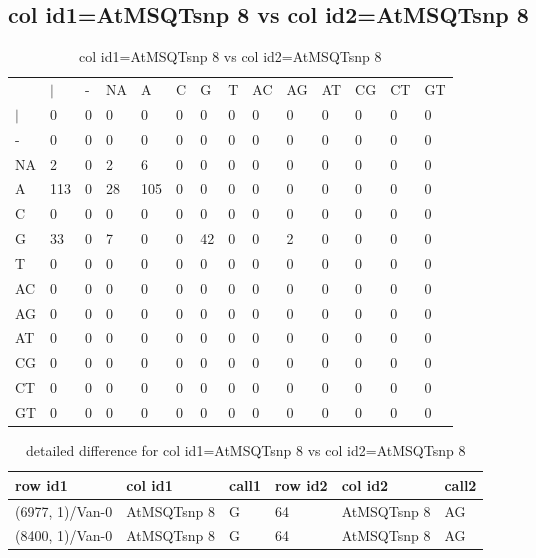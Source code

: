 \subsection{col id1=AtMSQTsnp 8 vs col id2=AtMSQTsnp 8}
\begin{center}
\begin{longtable}{|l|l|l|l|l|l|l|l|l|l|l|l|l|l|}
\caption{col id1=AtMSQTsnp 8 vs col id2=AtMSQTsnp 8} \label{table_dm962}\\
\hline
\\
\hline
&$|$&-&NA&A&C&G&T&AC&AG&AT&CG&CT&GT\\
$|$&0&0&0&0&0&0&0&0&0&0&0&0&0\\
-&0&0&0&0&0&0&0&0&0&0&0&0&0\\
NA&2&0&2&6&0&0&0&0&0&0&0&0&0\\
A&113&0&28&105&0&0&0&0&0&0&0&0&0\\
C&0&0&0&0&0&0&0&0&0&0&0&0&0\\
G&33&0&7&0&0&42&0&0&2&0&0&0&0\\
T&0&0&0&0&0&0&0&0&0&0&0&0&0\\
AC&0&0&0&0&0&0&0&0&0&0&0&0&0\\
AG&0&0&0&0&0&0&0&0&0&0&0&0&0\\
AT&0&0&0&0&0&0&0&0&0&0&0&0&0\\
CG&0&0&0&0&0&0&0&0&0&0&0&0&0\\
CT&0&0&0&0&0&0&0&0&0&0&0&0&0\\
GT&0&0&0&0&0&0&0&0&0&0&0&0&0\\
\hline
\end{longtable}
\end{center}

\begin{center}
\begin{longtable}{|l|l|l|l|l|l|}
\caption{detailed difference for col id1=AtMSQTsnp 8 vs col id2=AtMSQTsnp 8} \label{table_dm963}\\
\hline
row id1&col id1&call1&row id2&col id2&call2\\
\hline
(6977, 1)/Van-0&AtMSQTsnp 8&G&64&AtMSQTsnp 8&AG\\
(8400, 1)/Van-0&AtMSQTsnp 8&G&64&AtMSQTsnp 8&AG\\
\hline
\end{longtable}
\end{center}

